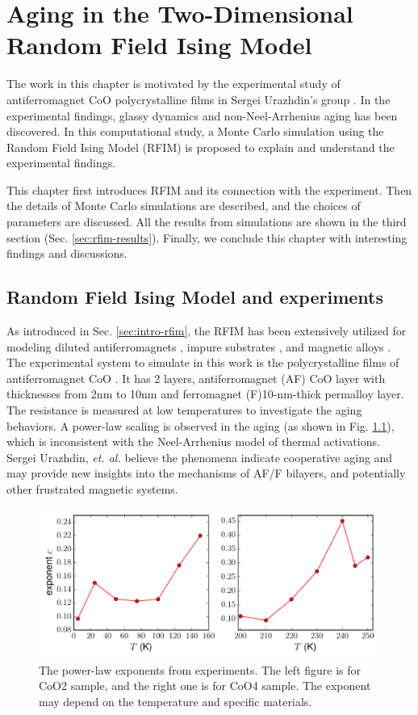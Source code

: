 
\chapter{Aging in the Two-Dimensional Random Field Ising Model}
\label{chap-rfim}
The work in this chapter is motivated by the experimental study of antiferromagnet CoO polycrystalline films in Sergei Urazhdin's group \cite{ma2016prb}. In the experimental findings, glassy dynamics and non-Neel-Arrhenius aging has been discovered. In this computational study, a Monte Carlo simulation using the Random Field Ising Model (RFIM) is proposed to explain and understand the experimental findings.

This chapter first introduces RFIM and its connection with the experiment. Then the details of Monte Carlo simulations are described, and the choices of parameters are discussed. All the results from simulations  are shown in the third section (Sec. \ref{sec:rfim-results}). Finally, we conclude this chapter with interesting findings and discussions.
 
\section{Random Field Ising Model and experiments }
\label{sec:rfim-model}
As introduced in Sec. \ref{sec:intro-rfim}, the RFIM has been extensively utilized for modeling diluted antiferromagnets \cite{fernandez1988random}, impure substrates \cite{villain1982commensurate}, and magnetic alloys \cite{fisher1988theory}. The experimental system to simulate in this work is the polycrystalline films of antiferromagnet CoO \cite{ma2016prb}. It has 2 layers, antiferromagnet (AF) CoO layer with thicknesses from 2nm to 10nm and ferromagnet (F)10-nm-thick permalloy layer. The resistance is measured at low temperatures to investigate the aging behaviors. A power-law scaling is observed in the aging (as shown in Fig. \ref{fig:rfim-expexp}), which is inconsistent with the Neel-Arrhenius model of thermal activations. Sergei Urazhdin, {\it et. al.} \cite{ma2016prb} believe the phenomena indicate cooperative aging and may  provide new insights into the mechanisms of AF/F bilayers, and potentially other frustrated magnetic systems.



\begin{figure}
\centering \includegraphics[width=0.7\columnwidth]{Chapter-4/experimental_exponent.pdf}
\protect\caption{The power-law exponents from experiments. The left figure is for CoO2 sample, and the right one is for CoO4 sample. The exponent may depend on the temperature and specific materials.}
\label{fig:rfim-expexp} 
\end{figure}


